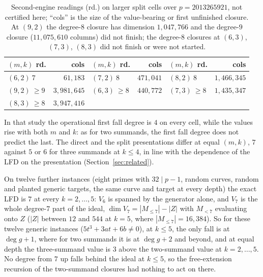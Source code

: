 \documentclass[11pt]{article}
\theoremstyle{definition}\newtheorem{definition}[theorem]{Definition}
\theoremstyle{remark}\newtheorem{remark}[theorem]{Remark}
\begin{document}
\begin{table}[htbp]
\centering\small
\begin{tabular}{@{}lr lr lr@{}}
\toprule
$(m,k)$ rd. & cols & $(m,k)$ rd. & cols & $(m,k)$ rd. & cols\\
\midrule
$(6,2)\ 7$ & $61{,}183$ & $(7,2)\ 8$ & $471{,}041$ & $(8,2)\ 8$ & $1{,}466{,}345$\\
$(9,2)\ {\ge}9$ & $3{,}981{,}645$ & $(6,3)\ {\ge}8$ & $440{,}772$ & $(7,3)\ {\ge}8$ & $1{,}435{,}347$\\
$(8,3)\ {\ge}8$ & $3{,}947{,}416$ & & & &\\
\bottomrule
\end{tabular}
\caption{Second-engine readings (rd.) on larger split cells over
$p=2013265921$, not certified here; ``cols'' is the size of the value-bearing
or first unfinished closure. At $(9,2)$ the degree-$8$ closure has dimension
$1{,}047{,}766$ and the degree-$9$ closure ($11{,}075{,}610$ columns) did not
finish; the degree-$8$ closures at $(6,3)$, $(7,3)$, $(8,3)$ did not finish or
were not started.}
\label{tab:splitlarge}
\end{table}

In that study the operational first fall degree is $4$ on every cell, while
the values rise with both $m$ and $k$: as for two summands, the first fall
degree does not predict the last. The direct and the split presentations
differ at equal $(m,k)$, $7$ against $5$ or $6$ for three summands at
$k\le4$, in line with the dependence of the LFD on the presentation
(Section~\ref{sec:related}).

On twelve further instances (eight primes with $32\mid p-1$, random curves, random and
planted generic targets, the same curve and target at every depth) the
exact LFD is $7$ at every $k=2,\ldots,5$: $V_6$ is spanned by the generator
alone, and $V_7$ is the whole degree-$7$ part of the ideal, $\dim
V_7=|M_{\le7}|-|Z|$ with $M_{<7}$ evaluating onto $Z$ ($|Z|$ between $12$
and $544$ at $k=5$, where $|M_{\le7}|=16{,}384$). So for these twelve
generic instances ($5t^3+3at+6b\ne0$), at $k\le5$, the only fall is at
$\deg g+1$, where for two summands it is at
$\deg g+2$ and beyond, and at equal depth the three-summand value is $3$
above the two-summand value at $k=2,\ldots,5$. No degree from $7$ up falls
behind the ideal at $k\le5$, so the free-extension recursion of the
two-summand closures had nothing to act on there.
\end{document}
